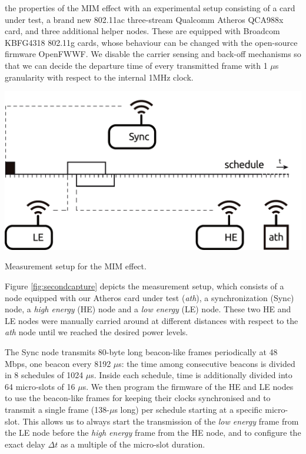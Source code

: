 \documentclass[twoside,nohyper]{tufte-book}
\theoremstyle{definition}
\theoremstyle{definition}
\theoremstyle{definition}
\theoremstyle{remark}
\begin{document}
 the properties of the MIM effect with an
experimental setup consisting of a card under test, a brand new 802.11ac
three-stream Qualcomm Atheros QCA988x card, and three additional helper
nodes. These are equipped with Broadcom KBFG4318 802.11g cards, whose
behaviour can be changed with the open-source firmware
OpenFWWF\cite[0pt]{openfwwfweb}.
We disable the carrier sensing and back-off mechanisms so that we can
decide the departure time of every transmitted frame with 1 \(\mu\)s
granularity with respect to the internal 1MHz clock.



\begin{marginfigure}

{\centering \includegraphics[width=1\linewidth]{img/05/testbed-francesco} 

}

\caption[Measurement setup for the MIM effect.]{Measurement setup for the MIM effect.}\label{fig:secondcapture}
\end{marginfigure}

Figure \ref{fig:secondcapture} depicts the measurement setup, which
consists of a node equipped with our Atheros card under test
(\emph{ath}), a synchronization (Sync) node, a \emph{high energy} (HE)
node and a \emph{low energy} (LE) node. These two HE and LE nodes were
manually carried around at different distances with respect to the
\emph{ath} node until we reached the desired power levels.

The Sync node transmits 80-byte long beacon-like frames periodically at
48 Mbps, one beacon every 8192 \(\mu\)s: the time among consecutive
beacons is divided in 8 schedules of 1024 \(\mu\)s. Inside each
schedule, time is additionally divided into 64 micro-slots of 16
\(\mu\)s. We then program the firmware of the HE and LE nodes to use the
beacon-like frames for keeping their clocks synchronised and to transmit
a single frame (138-\(\mu\)s long) per schedule starting at a specific
micro-slot. This allows us to always start the transmission of the
\emph{low energy} frame from the LE node before the \emph{high energy}
frame from the HE node, and to configure the exact delay \(\Delta t\) as
a multiple of the micro-slot duration.
\end{document}
